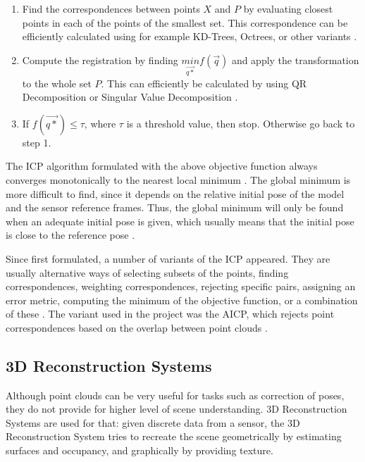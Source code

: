 \documentclass[12pt]{article}
\begin{document}
\begin{enumerate}[leftmargin=.8in]
\item Find the correspondences between points $X$ and $P$ by evaluating closest points in each of the points of the smallest set. This correspondence can be efficiently calculated using for example KD-Trees, Octrees, or other variants \cite{KDT}.
\item Compute the registration by finding $\underset{\overrightarrow{q*}}{min}f(\overrightarrow{q})$ and apply the transformation to the whole set $P$. This can efficiently be calculated by using QR Decomposition or Singular Value Decomposition \cite{ICPVariants}.
\item If $f(\overrightarrow{q*}) \leq \tau$, where $\tau$ is a threshold value, then stop. Otherwise go back to step 1.
\end{enumerate}	
	
The ICP algorithm formulated with the above objective function always converges monotonically to the nearest local minimum \cite{AMethodRegistration}. The global minimum is more difficult to find, since it depends on the relative initial pose of the model and the sensor reference frames. Thus, the global minimum will only be found when an adequate initial pose is given, which usually means that the initial pose is close to the reference pose \cite{AMethodRegistration}.

Since first formulated, a number of variants of the ICP appeared. They are usually alternative ways of selecting subsets of the points, finding correspondences, weighting correspondences, rejecting specific pairs, assigning an error metric, computing the minimum of the objective function, or a combination of these \cite{ICPVariants}. The variant used in the project was the AICP, which rejects point correspondences based on the overlap between point clouds \cite{7989547}.
	
	\subsection{3D Reconstruction Systems}

Although point clouds can be very useful for tasks such as correction of poses, they do not provide for higher level of scene understanding. 3D Reconstruction Systems are used for that: given discrete data from a sensor, the 3D Reconstruction System tries to recreate the scene geometrically by estimating surfaces and occupancy, and graphically by providing texture.
		
\end{document}
